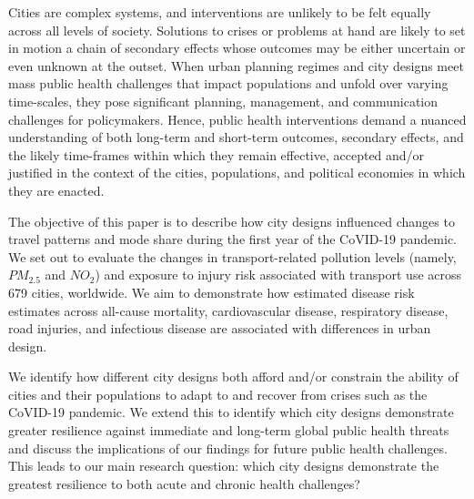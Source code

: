 \documentclass[preprint,12pt]{elsarticle}
\begin{document}
Cities are complex systems\cite{DiezRoux2015}, and interventions are unlikely to be felt equally across all levels of society. Solutions to crises or problems at hand are likely to set in motion a chain of secondary effects whose outcomes may be either uncertain or even unknown at the outset\cite{Sterman2006}. When urban planning regimes and city designs meet mass public health challenges that impact populations and unfold over varying time-scales\cite{casti2012x}, they pose significant planning, management, and communication challenges for policymakers\cite{thompson2022modelling,thompson2022framework}. Hence, public health interventions demand a nuanced understanding of both long-term and short-term  outcomes, secondary effects, and the likely time-frames within which they remain effective, accepted and/or justified in the context of the cities, populations, and political economies in which they are enacted\cite{dawson2016snakes, oliu2021sars}.


The objective of this paper is to describe how city designs influenced changes to travel patterns and mode share during the first year of the CoVID-19 pandemic. We set out to evaluate the changes in transport-related pollution levels (namely, \(PM_{2.5}\) and \(NO_{2}\)) and exposure to injury risk associated with transport use across 679 cities, worldwide. We aim to demonstrate how estimated disease risk estimates across all-cause mortality, cardiovascular disease, respiratory disease, road injuries, and infectious disease are associated with differences in urban design. 

We identify how different city designs both afford and/or constrain the ability of cities and their populations to adapt to and recover from crises such as the CoVID-19 pandemic. We extend this to identify which city designs demonstrate greater resilience against immediate and long-term global public health threats and discuss the implications of our findings for future public health challenges. This leads to our main research question: which city designs demonstrate the greatest resilience to both acute and chronic health challenges?





\end{document}

